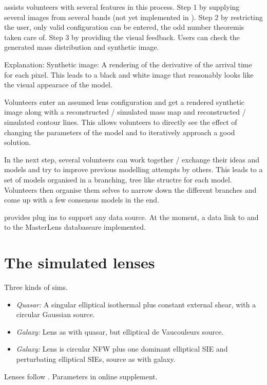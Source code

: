 \spl assists volunteers with several features in this process.
Step 1 by supplying several images from several bands (not yet implemented in \sw).
Step 2 by restricting the user, only valid configuration can be entered, the odd number theorem\needcite is taken care of.
Step 3 by providing the visual feedback. Users can check the generated mass distribution and synthetic image.

Explanation:
Synthetic image: A rendering of the derivative of the arrival time for each pixel. This leads to a black and white image that reasonably looks like the visual appearace of the model.

Volunteers enter an assumed lens configuration and get a rendered synthetic image along with a reconstructed / simulated mass map and reconstructed / simulated contour lines.
This allows volunteers to directly see the effect of changing the parameters of the model and to iteratively approach a good solution.

In the next step, several volunteers can work together / exchange their ideas and models and try to improve previous modelling attempts by others.
This leads to a set of models organised in a branching, tree like structre for each model.
Volunteers then organise them selves to narrow down the different branches and come up with a few consensus models in the end.

\spl provides plug ins to support any data source. At the moment, a data link to \sw and to the MasterLens database\needcite are implemented.






\section{The simulated lenses} \label{sec:sims}

Three kinds of sims.

\begin{itemize}
  \item {\em Quasar:\/} A singular elliptical isothermal plus constant
    external shear, with a circular Gaussian source.
  \item {\em Galaxy:\/} Lens as with quasar, but elliptical de
    Vaucouleurs source.
  \item {\em Galaxy:\/} Lens is circular NFW plus one dominant
    elliptical SIE and perturbating elliptical SIEs, source as with
    galaxy.
\end{itemize}
Lenses follow \cite{2001astro.ph..2341K,2001astro.ph..2340K}.
Parameters in online supplement.
